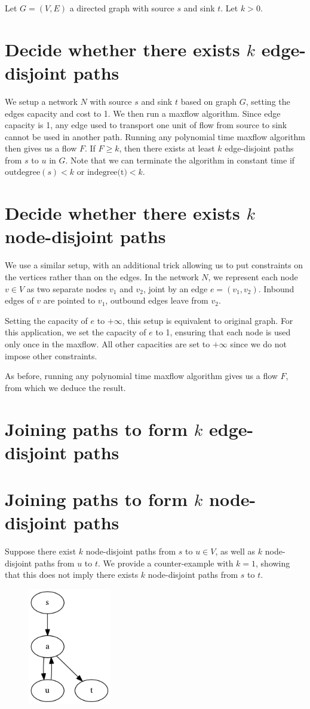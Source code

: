 Let $G = (V, E)$ a directed graph with source $s$ and sink $t$. Let $k > 0$.


\section{Decide whether there exists $k$ \textbf{edge}-disjoint paths}
We setup a network $N$ with source $s$ and sink $t$ based on graph $G$, setting the edges capacity and cost to 1. We then run a maxflow algorithm. Since edge capacity is 1, any edge used to transport one unit of flow from source to sink cannot be used in another path. Running any polynomial time maxflow algorithm then gives us a flow $F$. If $F \geq k$, then there exists at least $k$ edge-disjoint paths from $s$ to $u$ in $G$. Note that we can terminate the algorithm in constant time if $\text{outdegree}(s) < k$ or $\text{indegree(t)} < k$.

\section{Decide whether there exists $k$ \textbf{node}-disjoint paths}
We use a similar setup, with an additional trick allowing us to put constraints on the vertices rather than on the edges. In the network $N$, we represent each node $v \in V$ as two separate nodes $v_1$ and $v_2$, joint by an edge $e = (v_1, v_2)$. Inbound edges of $v$ are pointed to $v_1$, outbound edges leave from $v_2$.

Setting the capacity of $e$ to $+\infty$, this setup is equivalent to original graph. For this application, we set the capacity of $e$ to 1, ensuring that each node is used only once in the maxflow. All other capacities are set to $+\infty$ since we do not impose other constraints.

As before, running any polynomial time maxflow algorithm gives us a flow $F$, from which we deduce the result.

\section{Joining paths to form $k$ \textbf{edge}-disjoint paths}

\section{Joining paths to form $k$ \textbf{node}-disjoint paths}
Suppose there exist $k$ node-disjoint paths from $s$ to $u \in V$, as well as $k$ node-disjoint paths from $u$ to $t$. We provide a counter-example with $k = 1$, showing that this does not imply there exists $k$ node-disjoint paths from $s$ to $t$.

\begin{figure}[ht]
  \center
  \includegraphics[height=2in]{figures/Problem3-graph.png}
\end{figure}
